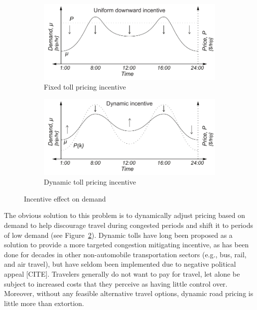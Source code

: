 \documentclass{article}
\begin{document}
\begin{figure}

\begin{subfigure}[h]{\linewidth}
	\includegraphics[width=\textwidth]{figures/flatprice}
	\centering
	\caption{Fixed toll pricing incentive}
	\label{fig:flatprice}
\end{subfigure}
\begin{subfigure}[h]{\linewidth}
	\includegraphics[width=\textwidth]{figures/dynamicprice}
	\centering
	\caption{Dynamic toll pricing incentive}
	\label{fig:dynamicprice}
\end{subfigure}
\label{fig:incentives}
\caption{Incentive effect on demand}
\end{figure}

The obvious solution to this problem is to dynamically adjust pricing based on demand to help discourage travel during congested periods and shift it to periods of low demand (see Figure~\ref{fig:dynamicprice}). Dynamic tolls have long been proposed as a solution to provide a more targeted congestion mitigating incentive, as has been done for decades in other non-automobile transportation sectors (e.g., bus, rail, and air travel), but have seldom been implemented due to negative political appeal [CITE]. Travelers generally do not want to pay for travel, let alone be subject to increased costs that they perceive as having little control over. Moreover, without any feasible alternative travel options, dynamic road pricing is little more than extortion. 
\end{document}
